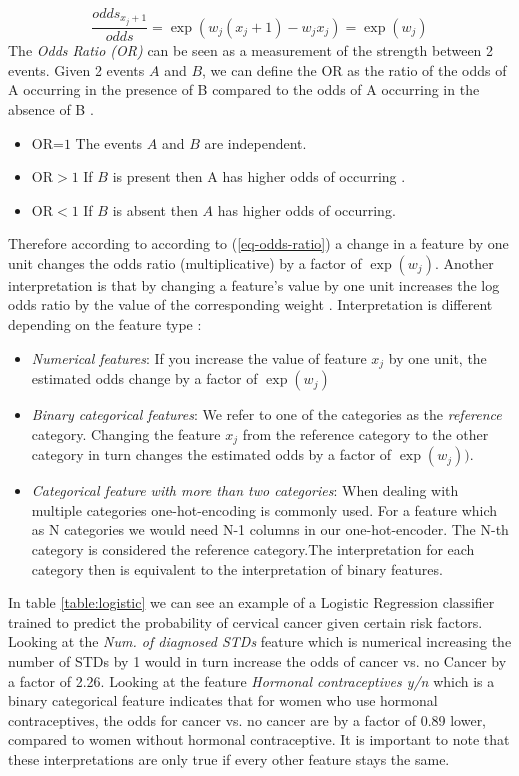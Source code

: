 \begin{equation}
    \frac{odds_{x_{j}+1}}{odds} = \exp(w_{j}(x_{j} + 1) - w_{j}x_{j}) = \exp(w_{j})
    \label{eq-odds-ratio}
\end{equation}
The \emph{Odds Ratio (OR)} can be seen as a measurement of the strength between 2 events. Given 2 events $A$ and $B$, we can define the OR as the ratio of the odds of A occurring in the presence of B compared to the odds of A occurring in the absence of B \cite {Szumilas2010ExplainingRatios}.
\begin{itemize}
    \item OR=$1$ The events $A$ and $B$ are independent.
    \item OR$>1$ If $B$ is present then A has higher odds of occurring .
    \item OR$<1$ If $B$ is absent then $A$ has higher odds of occurring.
\end{itemize}
Therefore according to according to (\ref{eq-odds-ratio}) a change in a feature by one unit changes the odds ratio (multiplicative) by a factor of $\exp(w_{j})$. Another interpretation is that by changing a feature's value by one unit increases the log odds ratio by the value of the corresponding weight \cite{molnar2019}. Interpretation is different depending on the feature type \cite{molnar2019}:
\begin{itemize}
    \item \emph{Numerical features}: If you increase the value of feature $x_{j}$ by one unit, the estimated odds change by a factor of $\exp(w_{j})$
    \item \emph{Binary categorical features}: We refer to one of the categories as the \emph{reference} category. Changing the feature $x_{j}$ from the reference category to the other category in turn changes the estimated odds by a factor of $\exp(w_{j}))$.
    \item \emph{Categorical feature with more than two categories}:  When dealing with multiple categories one-hot-encoding is commonly used. For a feature which as N categories we would need N-1 columns in our one-hot-encoder. The N-th category is  considered the reference category.The interpretation for each category then is equivalent to the interpretation of binary features.
\end{itemize}
In table \ref{table:logistic} we can see an example of a Logistic Regression classifier trained to predict the probability of cervical cancer given certain risk factors. Looking at the \emph{Num. of diagnosed STDs} feature which is numerical increasing the number of STDs by 1 would in turn increase the odds of cancer vs. no Cancer by a factor of 2.26. Looking at the feature \emph{Hormonal contraceptives y/n} which is a binary categorical feature indicates that for women who use hormonal contraceptives, the odds for cancer vs. no cancer are by a factor of 0.89 lower, compared to women without hormonal contraceptive. It is important to note that these interpretations are only true if every other feature stays the same.
